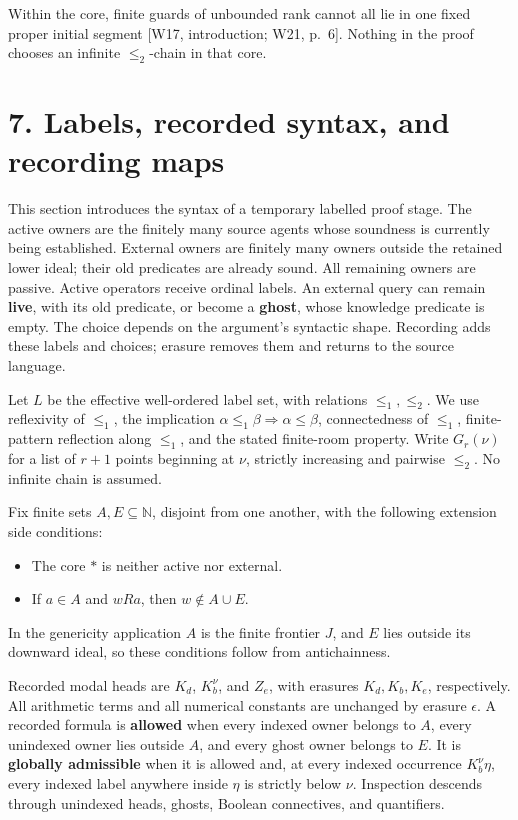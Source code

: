 \documentclass[
  11pt,
  letterpaper,
]{article}
\providecommand{\tightlist}{%
  \setlength{\itemsep}{0pt}\setlength{\parskip}{0pt}}
\begin{document}
Within the core, finite guards of unbounded rank cannot all lie in one
fixed proper initial segment {[}W17, introduction; W21, p.~6{]}. Nothing
in the proof chooses an infinite \(\leq_2\)-chain in that core.

\section{7. Labels, recorded syntax, and recording
maps}\label{labels-recorded-syntax-and-recording-maps}

This section introduces the syntax of a temporary labelled proof stage.
The active owners are the finitely many source agents whose soundness is
currently being established. External owners are finitely many owners
outside the retained lower ideal; their old predicates are already
sound. All remaining owners are passive. Active operators receive
ordinal labels. An external query can remain \textbf{live}, with its old
predicate, or become a \textbf{ghost}, whose knowledge predicate is
empty. The choice depends on the argument's syntactic shape. Recording
adds these labels and choices; erasure removes them and returns to the
source language.

Let \(L\) be the effective well-ordered label set, with relations
\(\leq_1,\leq_2\). We use reflexivity of \(\leq_1\), the implication
\(\alpha\leq_1\beta\Rightarrow\alpha\leq\beta\), connectedness of
\(\leq_1\), finite-pattern reflection along \(\leq_1\), and the stated
finite-room property. Write \(G_r(\nu)\) for a list of \(r+1\) points
beginning at \(\nu\), strictly increasing and pairwise \(\leq_2\). No
infinite chain is assumed.

Fix finite sets \(A,E\subseteq\mathbb N\), disjoint from one another,
with the following extension side conditions:

\begin{itemize}
\tightlist
\item
  The core \(*\) is neither active nor external.
\item
  If \(a\in A\) and \(wRa\), then \(w\notin A\cup E\).
\end{itemize}

In the genericity application \(A\) is the finite frontier \(J\), and
\(E\) lies outside its downward ideal, so these conditions follow from
antichainness.

Recorded modal heads are \(K_d\), \(K_b^\nu\), and \(Z_e\), with
erasures \(K_d,K_b,K_e\), respectively. All arithmetic terms and all
numerical constants are unchanged by erasure \(\epsilon\). A recorded
formula is \textbf{allowed} when every indexed owner belongs to \(A\),
every unindexed owner lies outside \(A\), and every ghost owner belongs
to \(E\). It is \textbf{globally admissible} when it is allowed and, at
every indexed occurrence \(K_b^\nu\eta\), every indexed label anywhere
inside \(\eta\) is strictly below \(\nu\). Inspection descends through
unindexed heads, ghosts, Boolean connectives, and quantifiers.
\end{document}
